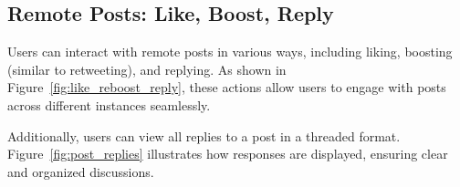 \clearpage

\subsection{Remote Posts: Like, Boost, Reply}
Users can interact with remote posts in various ways, including liking, boosting (similar to retweeting), and replying. As shown in Figure~\ref{fig:like_reboost_reply}, these actions allow users to engage with posts across different instances seamlessly.

Additionally, users can view all replies to a post in a threaded format. Figure~\ref{fig:post_replies} illustrates how responses are displayed, ensuring clear and organized discussions.

\begin{figure}[htbp]
  \centering
  \begin{minipage}[b]{0.45\linewidth}
    \centering

\end{minipage}
\end{figure}
